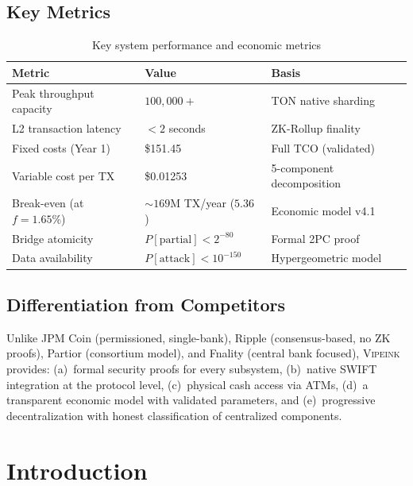 \documentclass[12pt,a4paper]{article}
\theoremstyle{definition}
\theoremstyle{remark}
\newcommand{\Vipeink}{\textsc{Vipeink}}
\newcommand{\USD}[1]{\$#1}
\newcommand{\MUSD}[1]{\$#1\,\text{M}}
\newcommand{\TPS}{\text{TPS}}
\begin{document}
\subsection{Key Metrics}

\begin{table}[H]
\centering
\caption{Key system performance and economic metrics}
\label{tab:key-metrics}
\begin{tabular}{lll}
\toprule
\textbf{Metric} & \textbf{Value} & \textbf{Basis} \\
\midrule
Peak throughput capacity & $100{,}000+$ \TPS{} & TON native sharding \\
L2 transaction latency & $< 2$ seconds & ZK-Rollup finality \\
Fixed costs (Year 1) & \MUSD{151.45} & Full TCO (validated) \\
Variable cost per TX & \USD{0.01253} & 5-component decomposition \\
Break-even (at $f=1.65\%$) & ${\sim}169$M TX/year ($5.36$ \TPS{}) & Economic model v4.1 \\
Bridge atomicity & $P[\text{partial}] < 2^{-80}$ & Formal 2PC proof \\
Data availability & $P[\text{attack}] < 10^{-150}$ & Hypergeometric model \\
\bottomrule
\end{tabular}
\end{table}

\subsection{Differentiation from Competitors}

Unlike JPM Coin (permissioned, single-bank), Ripple (consensus-based, no ZK proofs), Partior (consortium model), and Fnality (central bank focused), \Vipeink{} provides: (a)~formal security proofs for every subsystem, (b)~native SWIFT integration at the protocol level, (c)~physical cash access via ATMs, (d)~a transparent economic model with validated parameters, and (e)~progressive decentralization with honest classification of centralized components.


\section{Introduction}
\label{sec:introduction}
\end{document}

